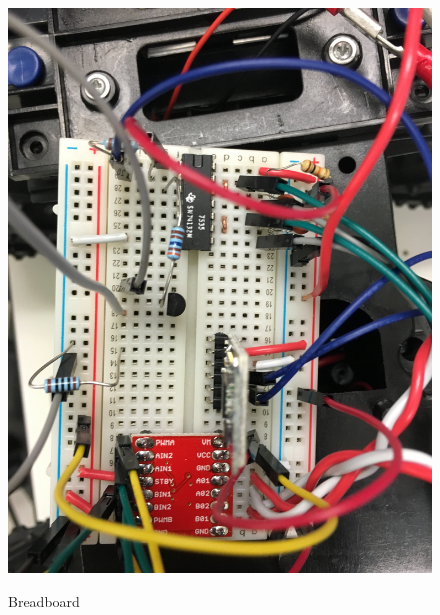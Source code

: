 \documentclass[12pt]{article}
\begin{document}
\begin{figure}[H]
\begin {center}
\includegraphics[scale=.10]{car-breadboard}\\
\caption{Breadboard}
\label{fig:breadboard}
\end {center}
\end{figure}
\end{document}
